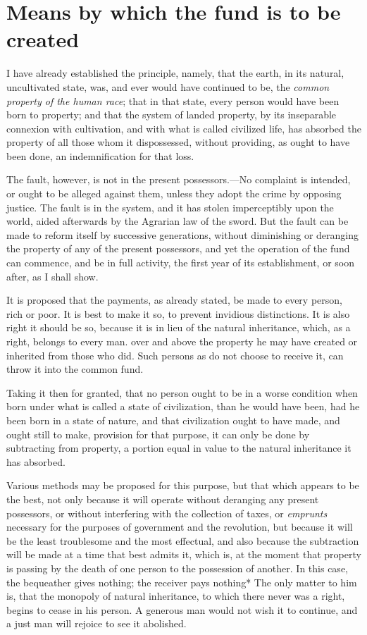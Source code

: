 \section*{Means by which the fund is to be created}
I have already established the principle, namely, that the earth, in its natural, uncultivated state, was, and ever would have continued to be, the \emph{common property of the human race}; that in that state, every person would have been born to property; and that the system of landed property, by its inseparable connexion with cultivation, and with what is called civilized life, has absorbed the property of all those whom it dispossessed, without providing, as ought to have been done, an indemnification for that loss.

The fault, however, is not in the present possessors.—No complaint is intended, or ought to be alleged against them, unless they adopt the crime by opposing justice. The fault is in the system, and it has stolen imperceptibly upon the world, aided afterwards by the Agrarian law of the sword. But the fault can be made to reform itself by successive generations, without diminishing or deranging the property of any of the present possessors, and yet the operation of the fund can commence, and be in full activity, the first year of its establishment, or soon after, as I shall show.

It is proposed that the payments, as already stated, be made to every person, rich or poor. It is best to make it so, to prevent invidious distinctions. It is also right it should be so, because it is in lieu of the natural inheritance, which, as a right, belongs to every man. over and above the property he may have created or inherited from those who did. Such persons as do not choose to receive it, can throw it into the common fund.

Taking it then for granted, that no person ought to be in a worse condition when born under what is called a state of civilization, than he would have been, had he been born in a state of nature, and that civilization ought to have made, and ought still to make, provision for that purpose, it can only be done by subtracting from property, a portion equal in value to the natural inheritance it has absorbed.

Various methods may be proposed for this purpose, but that which appears to be the best, not only because it will operate without deranging any present possessors, or without interfering with the collection of taxes, or \emph{emprunts} necessary for the purposes of government and the revolution, but because it will be the least troublesome and the most effectual, and also because the subtraction will be made at a time that best admits it, which is, at the moment that property is passing by the death of one person to the possession of another. In this case, the bequeather gives nothing; the receiver pays nothing* The only matter to him is, that the monopoly of natural inheritance, to which there never was a right, begins to cease in his person. A generous man would not wish it to continue, and a just man will rejoice to see it abolished.

